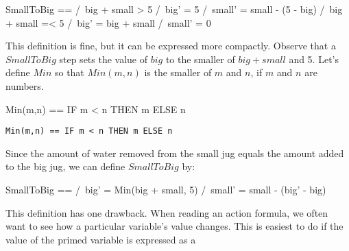 \begin{display}
\begin{notla}
SmallToBig == \/ /\ big + small > 5
                 /\ big' = 5
                 /\ small' = small - (5 - big)
              \/ /\ big + small =< 5
                 /\ big' = big + small
                 /\ small' = 0
\end{notla}
\begin{tlatex}
%
%
%
%
%
%
%
%
\end{tlatex}
\end{display}
This definition is fine, but it can be expressed more compactly.
Observe that a $SmallToBig$ step sets the value of $big$ to the
smaller of $big+small$ and 5.  Let's define $Min$ so that $Min(m, n)$
is the smaller of $m$ and $n$, if $m$ and $n$ are numbers.
\begin{twocols}
\begin{notla}
Min(m,n) == IF m < n THEN m ELSE n
\end{notla}
\begin{tlatex}
%
\end{tlatex}
\midcol
\verb|Min(m,n) == IF m < n THEN m ELSE n|
\end{twocols}
Since the amount of water removed from the small jug equals the amount
added to the big jug, we can define $SmallToBig$ by:
\begin{display}
\begin{notla}
SmallToBig == /\ big' = Min(big + small, 5)
              /\ small' = small - (big' - big)
\end{notla}
\begin{tlatex}
\end{tlatex}
\end{display}
This definition has one drawback.  When reading an action formula, we
often want to see how a particular variable's value changes.  This is
easiest to do if the value of the primed variable is expressed as a
